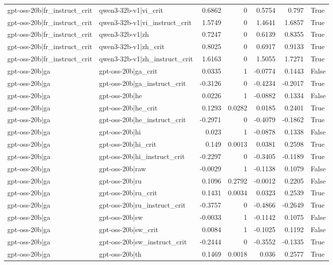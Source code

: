 \begin{table}
\begin{tabular}{l l r r r r l}
gpt-oss-20b|fr_instruct_crit & qwen3-32b-v1|vi_crit & 0.6862 & 0 & 0.5754 & 0.797 & True \\
gpt-oss-20b|fr_instruct_crit & qwen3-32b-v1|vi_instruct_crit & 1.5749 & 0 & 1.4641 & 1.6857 & True \\
gpt-oss-20b|fr_instruct_crit & qwen3-32b-v1|zh & 0.7247 & 0 & 0.6139 & 0.8355 & True \\
gpt-oss-20b|fr_instruct_crit & qwen3-32b-v1|zh_crit & 0.8025 & 0 & 0.6917 & 0.9133 & True \\
gpt-oss-20b|fr_instruct_crit & qwen3-32b-v1|zh_instruct_crit & 1.6163 & 0 & 1.5055 & 1.7271 & True \\
gpt-oss-20b|ga & gpt-oss-20b|ga_crit & 0.0335 & 1 & -0.0774 & 0.1443 & False \\
gpt-oss-20b|ga & gpt-oss-20b|ga_instruct_crit & -0.3126 & 0 & -0.4234 & -0.2017 & True \\
gpt-oss-20b|ga & gpt-oss-20b|he & 0.0226 & 1 & -0.0882 & 0.1334 & False \\
gpt-oss-20b|ga & gpt-oss-20b|he_crit & 0.1293 & 0.0282 & 0.0185 & 0.2401 & True \\
gpt-oss-20b|ga & gpt-oss-20b|he_instruct_crit & -0.2971 & 0 & -0.4079 & -0.1862 & True \\
gpt-oss-20b|ga & gpt-oss-20b|hi & 0.023 & 1 & -0.0878 & 0.1338 & False \\
gpt-oss-20b|ga & gpt-oss-20b|hi_crit & 0.149 & 0.0013 & 0.0381 & 0.2598 & True \\
gpt-oss-20b|ga & gpt-oss-20b|hi_instruct_crit & -0.2297 & 0 & -0.3405 & -0.1189 & True \\
gpt-oss-20b|ga & gpt-oss-20b|raw & -0.0029 & 1 & -0.1138 & 0.1079 & False \\
gpt-oss-20b|ga & gpt-oss-20b|ru & 0.1096 & 0.2792 & -0.0012 & 0.2205 & False \\
gpt-oss-20b|ga & gpt-oss-20b|ru_crit & 0.1431 & 0.0034 & 0.0323 & 0.2539 & True \\
gpt-oss-20b|ga & gpt-oss-20b|ru_instruct_crit & -0.3757 & 0 & -0.4866 & -0.2649 & True \\
gpt-oss-20b|ga & gpt-oss-20b|sw & -0.0033 & 1 & -0.1142 & 0.1075 & False \\
gpt-oss-20b|ga & gpt-oss-20b|sw_crit & 0.0084 & 1 & -0.1025 & 0.1192 & False \\
gpt-oss-20b|ga & gpt-oss-20b|sw_instruct_crit & -0.2444 & 0 & -0.3552 & -0.1335 & True \\
gpt-oss-20b|ga & gpt-oss-20b|th & 0.1469 & 0.0018 & 0.036 & 0.2577 & True \\

\end{tabular}
\end{table}

